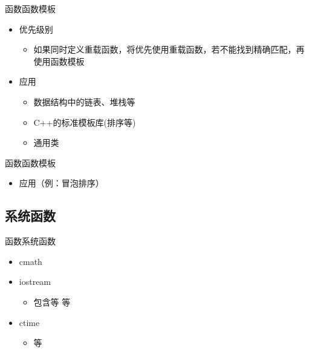 \begin{frame}[fragile]{函数}{函数模板}
  \stretchon
  \begin{itemize}  
  \item 优先级别
    \begin{itemize}
    \item 如果同时定义重载函数，将优先使用重载函数，若不能找到精确匹配，再使用函数模板
    \end{itemize}
  \item 应用
    \begin{itemize}
    \item 数据结构中的链表、堆栈等
    \item C++的标准模板库(排序等)
    \item 通用类
    \end{itemize}
  \end{itemize}
  \stretchoff
\end{frame}

\begin{frame}[fragile]{函数}{函数模板}
  \begin{itemize}  
  \item 应用（例：冒泡排序）\\
    \begin{center}      
      \begin{minipage}{0.6\linewidth}
      \end{minipage}
    \end{center}
  \end{itemize}
\end{frame}
\subsection{系统函数}
\begin{frame}[fragile]{函数}{系统函数}
  \stretchon
  \begin{itemize}  
  \item cmath
  \item iostream
    \begin{itemize}
    \item 包含等
        等
    \end{itemize}
  \item ctime
    \begin{itemize}
    \item {}等
    \end{itemize}
  \end{itemize}
  \stretchoff
\end{frame}  


